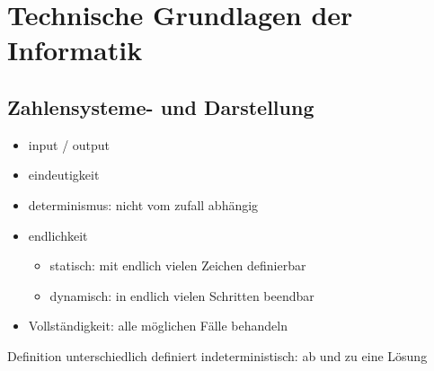 \documentclass[12pt]{article}
\begin{document}
    \section*{Technische Grundlagen der Informatik}

    \subsection*{Zahlensysteme- und Darstellung}
    

    \begin{itemize}
        \item input / output
        \item eindeutigkeit
        \item determinismus: nicht vom zufall abhängig
        \item endlichkeit
        \begin{itemize}
            \item statisch: mit endlich vielen Zeichen definierbar
            \item dynamisch: in endlich vielen Schritten beendbar
        \end{itemize}
        \item Vollständigkeit: alle möglichen Fälle behandeln 
    \end{itemize}
    
    Definition
        unterschiedlich definiert
        indeterministisch: ab und zu eine Lösung
\end{document}
